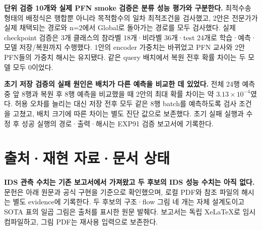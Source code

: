 \textbf{단위 검증 10개와 실제 PFN smoke 검증은 분류 성능 평가와 구분한다.} 최적수송 형태의 배정식은 행합뿐 아니라 목적함수의 일차 최적조건을 검사했고, 2안은 전문가가 실제 채택되는 경로와 n=2에서 Global로 돌아가는 경로를 모두 검사했다. 실제 checkpoint 검증은 3개 클래스의 참라벨 18개·비라벨 36개·test 24개로 학습·예측·모델 저장/복원까지 수행했다. 1안의 encoder 가중치는 바뀌었고 PFN 교사와 2안 PFN들의 가중치 해시는 유지됐다. 같은 query 배치에서 복원 전후 확률 차이는 두 모델 모두 0이었다.

\textbf{초기 저장 검증의 실패 원인은 배치가 다른 예측을 비교한 데 있었다.} 전체 24행 예측 중 앞 8행과 복원 후 8행 예측을 비교했을 때 2안의 최대 확률 차이는 약 $3.13\times10^{-4}$였다. 허용 오차를 늘리는 대신 저장 전후 모두 같은 8행 batch를 예측하도록 검사 조건을 고쳤고, 배치 크기에 따른 차이는 별도 진단 값으로 보존했다. 초기 실패 실행과 수정 후 성공 실행의 경로·출력·해시는 EXP91 검증 보고서에 기록한다.

\appendix
\section{출처·재현 자료·문서 상태}
\textbf{IDS 관측 수치는 기존 보고서에서 가져왔고 두 후보의 IDS 성능 수치는 아직 없다.} 문헌은 아래 원문과 공식 구현을 기준으로 확인했으며, 로컬 PDF와 참조 파일의 해시는 별도 evidence에 기록한다. 두 후보의 구조·flow 그림 네 개는 자체 설계도이고 SOTA 표의 일곱 그림은 출처를 표시한 원문 발췌다. 보고서는 독립 XeLaTeX로 임시 컴파일하고, 그림 PDF는 재사용 입력으로 보존한다.

